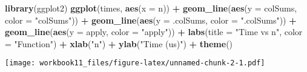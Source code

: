 \documentclass[
]{article}
\newenvironment{Shaded}{\begin{snugshade}}{\end{snugshade}}
\newcommand{\DataTypeTok}[1]{\textcolor[rgb]{0.13,0.29,0.53}{#1}}
\newcommand{\KeywordTok}[1]{\textcolor[rgb]{0.13,0.29,0.53}{\textbf{#1}}}
\newcommand{\NormalTok}[1]{#1}
\newcommand{\OperatorTok}[1]{\textcolor[rgb]{0.81,0.36,0.00}{\textbf{#1}}}
\newcommand{\StringTok}[1]{\textcolor[rgb]{0.31,0.60,0.02}{#1}}
\begin{document}
\begin{Shaded}
\begin{Highlighting}[]
\KeywordTok{library}\NormalTok{(ggplot2)}
\KeywordTok{ggplot}\NormalTok{(times, }\KeywordTok{aes}\NormalTok{(}\DataTypeTok{x =}\NormalTok{ n)) }\OperatorTok{+}
\StringTok{    }\KeywordTok{geom\_line}\NormalTok{(}\KeywordTok{aes}\NormalTok{(}\DataTypeTok{y =}\NormalTok{ colSums, }\DataTypeTok{color =} \StringTok{"colSums"}\NormalTok{)) }\OperatorTok{+}
\StringTok{    }\KeywordTok{geom\_line}\NormalTok{(}\KeywordTok{aes}\NormalTok{(}\DataTypeTok{y =}\NormalTok{ .colSums, }\DataTypeTok{color =} \StringTok{".colSums"}\NormalTok{)) }\OperatorTok{+}
\StringTok{    }\KeywordTok{geom\_line}\NormalTok{(}\KeywordTok{aes}\NormalTok{(}\DataTypeTok{y =}\NormalTok{ apply, }\DataTypeTok{color =} \StringTok{"apply"}\NormalTok{)) }\OperatorTok{+}
\StringTok{    }\KeywordTok{labs}\NormalTok{(}\DataTypeTok{title =} \StringTok{"Time vs n"}\NormalTok{, }\DataTypeTok{color =} \StringTok{"Function"}\NormalTok{) }\OperatorTok{+}
\StringTok{    }\KeywordTok{xlab}\NormalTok{(}\StringTok{"n"}\NormalTok{) }\OperatorTok{+}
\StringTok{    }\KeywordTok{ylab}\NormalTok{(}\StringTok{"Time (us)"}\NormalTok{) }\OperatorTok{+}
\StringTok{    }\KeywordTok{theme}\NormalTok{()}
\end{Highlighting}
\end{Shaded}

\texttt{[image: workbook11\_files/figure-latex/unnamed-chunk-2-1.pdf]}
\end{document}
